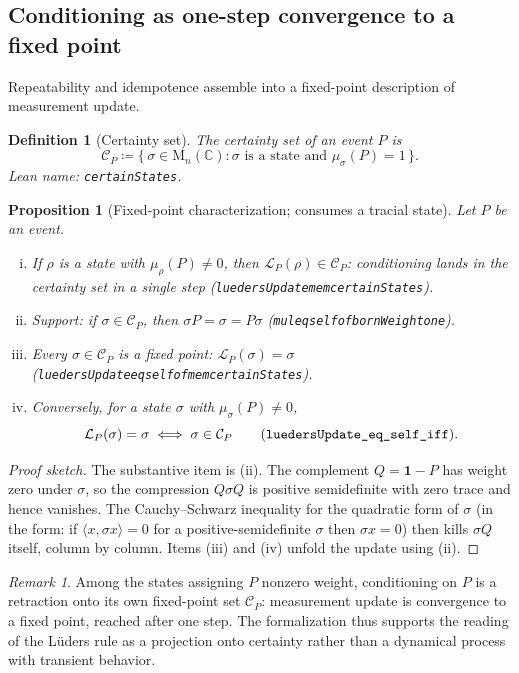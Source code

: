 \documentclass[11pt]{article}
\renewcommand{\_}{\textunderscore\allowbreak}
\newtheorem{definition}{Definition}
\newtheorem{proposition}{Proposition}
\theoremstyle{remark}
\newtheorem{remark}{Remark}
\newcommand{\C}{\mathbb C}
\newcommand{\Mn}{\mathrm{M}_n(\C)}
\newcommand{\one}{\mathbf 1}
\newcommand{\lued}{\mathcal L}
\begin{document}
\subsection{Conditioning as one-step convergence to a fixed point}

Repeatability and idempotence assemble into a fixed-point description of measurement update.

\begin{definition}[Certainty set]
\label{def:certain}
The \emph{certainty set} of an event $P$ is
\[
\mathcal C_P \coloneqq \{\, \sigma \in \Mn : \sigma \text{ is a state and } \mu_\sigma(P) = 1 \,\}.
\]
Lean name: \texttt{certainStates}.
\end{definition}

\begin{proposition}[Fixed-point characterization; consumes a tracial state]
\label{prop:fixed}
Let $P$ be an event.
\begin{enumerate}[(i)]
\item If $\rho$ is a state with $\mu_\rho(P) \neq 0$, then $\lued_P(\rho) \in \mathcal C_P$: conditioning lands in the certainty set in a single step (\texttt{luedersUpdate\_mem\_certainStates}).
\item Support: if $\sigma \in \mathcal C_P$, then $\sigma P = \sigma = P \sigma$ (\texttt{mul\_eq\_self\_of\_bornWeight\_one}).
\item Every $\sigma \in \mathcal C_P$ is a fixed point: $\lued_P(\sigma) = \sigma$ (\texttt{luedersUpdate\_eq\_self\_of\_mem\_certainStates}).
\item Conversely, for a state $\sigma$ with $\mu_\sigma(P) \neq 0$,
\[
\lued_P(\sigma) = \sigma \iff \sigma \in \mathcal C_P
\qquad (\texttt{luedersUpdate\_eq\_self\_iff}).
\]
\end{enumerate}
\end{proposition}

\begin{proof}[Proof sketch]
The substantive item is (ii). The complement $Q = \one - P$ has weight zero under $\sigma$, so the compression $Q \sigma Q$ is positive semidefinite with zero trace and hence vanishes. The Cauchy--Schwarz inequality for the quadratic form of $\sigma$ (in the form: if $\langle x, \sigma x\rangle = 0$ for a positive-semidefinite $\sigma$ then $\sigma x = 0$) then kills $\sigma Q$ itself, column by column. Items (iii) and (iv) unfold the update using (ii).
\end{proof}

\begin{remark}
Among the states assigning $P$ nonzero weight, conditioning on $P$ is a retraction onto its own fixed-point set $\mathcal C_P$: measurement update is convergence to a fixed point, reached after one step. The formalization thus supports the reading of the L\"uders rule as a projection onto certainty rather than a dynamical process with transient behavior.
\end{remark}
\end{document}
